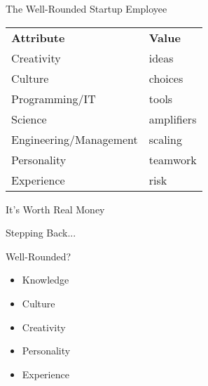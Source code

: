 \documentclass{beamer}
\begin{document}
\begin{frame}{The Well-Rounded Startup Employee}

\begin{centering}

\begin{tabular}{ll}
\textbf{Attribute}         &  \textbf{Value}  \vspace{0.5cm} \\

Creativity                 &  ideas        \\ 
Culture                    &  choices      \vspace{0.5cm} \\ 

Programming/IT             &  tools        \\
Science                    &  amplifiers   \\
Engineering/Management     &  scaling      \vspace{0.5cm} \\ 

Personality                &  teamwork     \\
Experience                 &  risk         
\end{tabular}

\end{centering}

\end{frame}

\begin{frame}{It's Worth Real Money}
\end{frame}

\begin{frame}{Stepping Back...}

Well-Rounded?
\begin{itemize}
  \item Knowledge
  \item Culture
  \item Creativity
  \item Personality
  \item Experience
\end{itemize}

\end{frame}
\end{document}
